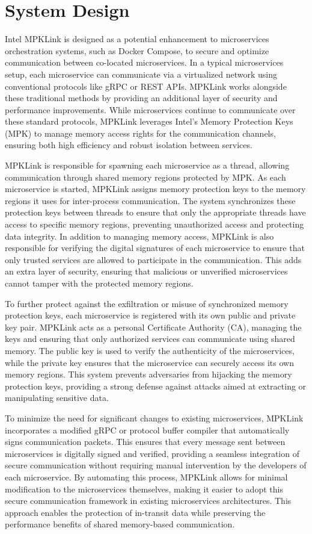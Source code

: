 \documentclass[letterpaper,twocolumn,10pt]{article}
\begin{document}
\section{System Design}
Intel MPKLink is designed as a potential enhancement to microservices orchestration systems, such as Docker Compose, to secure and optimize communication between co-located microservices.
In a typical microservices setup, each microservice can communicate via a virtualized network using conventional protocols like gRPC or REST APIs.
MPKLink works alongside these traditional methods by providing an additional layer of security and performance improvements.
While microservices continue to communicate over these standard protocols, MPKLink leverages Intel's Memory Protection Keys (MPK) to manage memory access rights for the communication channels, ensuring both high efficiency and robust isolation between services.

MPKLink is responsible for spawning each microservice as a thread, allowing communication through shared memory regions protected by MPK.
As each microservice is started, MPKLink assigns memory protection keys to the memory regions it uses for inter-process communication.
The system synchronizes these protection keys between threads to ensure that only the appropriate threads have access to specific memory regions, preventing unauthorized access and protecting data integrity.
In addition to managing memory access, MPKLink is also responsible for verifying the digital signatures of each microservice to ensure that only trusted services are allowed to participate in the communication.
This adds an extra layer of security, ensuring that malicious or unverified microservices cannot tamper with the protected memory regions.

To further protect against the exfiltration or misuse of synchronized memory protection keys, each microservice is registered with its own public and private key pair.
MPKLink acts as a personal Certificate Authority (CA), managing the keys and ensuring that only authorized services can communicate using shared memory.
The public key is used to verify the authenticity of the microservices, while the private key ensures that the microservice can securely access its own memory regions.
This system prevents adversaries from hijacking the memory protection keys, providing a strong defense against attacks aimed at extracting or manipulating sensitive data.

To minimize the need for significant changes to existing microservices, MPKLink incorporates a modified gRPC or protocol buffer compiler that automatically signs communication packets.
This ensures that every message sent between microservices is digitally signed and verified, providing a seamless integration of secure communication without requiring manual intervention by the developers of each microservice.
By automating this process, MPKLink allows for minimal modification to the microservices themselves, making it easier to adopt this secure communication framework in existing microservices architectures.
This approach enables the protection of in-transit data while preserving the performance benefits of shared memory-based communication.
\end{document}
